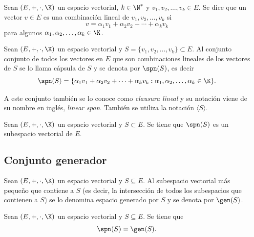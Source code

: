 \documentclass[a4,11pt]{aleph-notas}
\begin{document}
\begin{defi}
    Sean $(E,+,\cdot,\K)$ un espacio vectorial, $k\in\N^*$ y $v_1, v_2, \ldots, v_k \in E$. Se dice que un vector $v \in E$ es una combinación lineal de 
    $v_1, v_2, \ldots, v_k$ si 
    \[
        v = \alpha_1 v_1 + \alpha_2 v_2 + \cdots + \alpha_k v_k
    \]
    para algunos $\alpha_1, \alpha_2, \ldots, \alpha_k \in \K$.
\end{defi}

\begin{defi}
    Sean $(E,+,\cdot,\K)$ un espacio vectorial y $S = \{v_1, v_2, \ldots, v_k\} \subset E$. Al conjunto conjunto de todos los vectores en $E$ que son combinaciones lineales de los vectores de $S$ se lo llama cápsula de $S$ y se denota por $\spn(S)$, es decir
    \[
        \spn(S) = \{\alpha_1 v_1 + \alpha_2 v_2 + \cdots + \alpha_k v_k:\alpha_1, \alpha_2, \ldots, \alpha_k \in \K\}.
    \]
\end{defi}

\begin{advertencia}
    A este conjunto también se lo conoce como \emph{clausura lineal} y su notación viene de su nombre en inglés, \emph{linear span}. También se utiliza la notación $\langle S\rangle$.
\end{advertencia}

\begin{teo}
   Sean $(E,+,\cdot,\K)$ un espacio vectorial y $S\subset E$. Se tiene que $\spn(S)$ es un subespacio vectorial de $E$.
\end{teo}

\subsection{Conjunto generador}

\begin{defi}
    Sean $(E,+,\cdot,\K)$ un espacio vectorial y $S\subseteq E$. Al subespacio vectorial más pequeño que contiene a $S$ (es decir, la intersección de todos los subespacios que contienen a $S$) se lo denomina espacio generado por $S$ y se denota por $\gen(S)$.
\end{defi}

\begin{teo}
    Sean $(E,+,\cdot,\K)$ un espacio vectorial y $S\subseteq E$. Se tiene que
    \[
        \spn(S)=\gen(S).
    \]
\end{teo}
\end{document}
